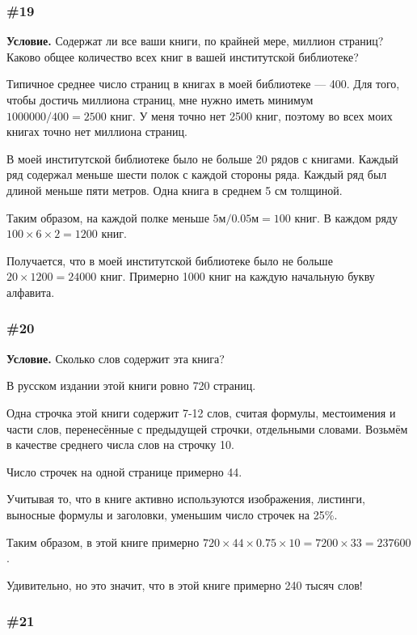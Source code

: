 \documentclass{article}
\begin{document}
\subsubsection{\#19}

\textbf{Условие.}
Содержат ли все ваши книги, по крайней мере, миллион страниц?
Каково общее количество всех книг в вашей институтской библиотеке?

Типичное среднее число страниц в книгах в моей библиотеке --- 400.
Для того, чтобы достичь миллиона страниц, мне нужно иметь минимум $1000000 / 400 = 2500$ книг.
У меня точно нет 2500 книг, поэтому во всех моих книгах точно нет миллиона страниц.

В моей институтской библиотеке было не больше 20 рядов с книгами.
Каждый ряд содержал меньше шести полок с каждой стороны ряда.
Каждый ряд был длиной меньше пяти метров.
Одна книга в среднем 5 см толщиной.

Таким образом, на каждой полке меньше $5 м / 0.05 м = 100$ книг.
В каждом ряду $100 \times 6 \times 2 = 1200$ книг.

Получается, что в моей институтской библиотеке было не больше $20 \times 1200 = 24000$ книг.
Примерно 1000 книг на каждую начальную букву алфавита.

\subsubsection{\#20}

\textbf{Условие.}
Сколько слов содержит эта книга?

В русском издании этой книги ровно 720 страниц.

Одна строчка этой книги содержит 7-12 слов, считая формулы, местоимения и части слов,
перенесённые с предыдущей строчки, отдельными словами.
Возьмём в качестве среднего числа слов на строчку 10.

Число строчек на одной странице примерно 44.

Учитывая то, что в книге активно используются изображения, листинги, выносные формулы и заголовки,
уменьшим число строчек на 25\%.

Таким образом, в этой книге примерно $720 \times 44 \times 0.75 \times 10 = 7200 \times 33 = 237600$.

Удивительно, но это значит, что в этой книге примерно 240 тысяч слов!

\subsubsection{\#21}
\end{document}
